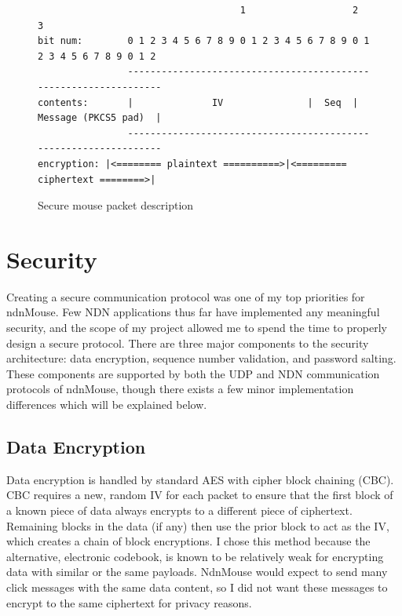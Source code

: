 \documentclass{sig-alternate}
\renewcommand\_{\textunderscore\allowbreak}  %
\begin{document}
\begin{figure}
	\hypertarget{fig:mousePacketDescription}{}
\begin{lstlisting}
                                    1                   2                   3
bit num:        0 1 2 3 4 5 6 7 8 9 0 1 2 3 4 5 6 7 8 9 0 1 2 3 4 5 6 7 8 9 0 1 2
                -----------------------------------------------------------------
contents:       |              IV               |  Seq  |  Message (PKCS5 pad)  |
                -----------------------------------------------------------------
encryption:	|<======== plaintext ==========>|<========= ciphertext ========>|
\end{lstlisting}
\caption{Secure mouse packet description}
\end{figure}

\section{Security}
Creating a secure communication protocol was one of my top priorities for ndnMouse. Few NDN applications thus far have implemented any meaningful security, and the scope of my project allowed me to spend the time to properly design a secure protocol. There are three major components to the security architecture: data encryption, sequence number validation, and password salting. These components are supported by both the UDP and NDN communication protocols of ndnMouse, though there exists a few minor implementation differences which will be explained below.

\subsection{Data Encryption}
Data encryption is handled by standard AES with cipher block chaining (CBC). CBC requires a new, random IV for each packet to ensure that the first block of a known piece of data always encrypts to a different piece of ciphertext. Remaining blocks in the data (if any) then use the prior block to act as the IV, which creates a chain of block encryptions. I chose this method because the alternative, electronic codebook, is known to be relatively weak for encrypting data with similar or the same payloads. NdnMouse would expect to send many click messages with the same data content, so I did not want these messages to encrypt to the same ciphertext for privacy reasons. 
\end{document}
